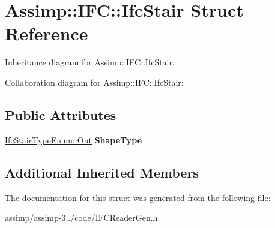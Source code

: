 \hypertarget{struct_assimp_1_1_i_f_c_1_1_ifc_stair}{\section{Assimp\+:\+:I\+F\+C\+:\+:Ifc\+Stair Struct Reference}
\label{struct_assimp_1_1_i_f_c_1_1_ifc_stair}
}


Inheritance diagram for Assimp\+:\+:I\+F\+C\+:\+:Ifc\+Stair\+:


Collaboration diagram for Assimp\+:\+:I\+F\+C\+:\+:Ifc\+Stair\+:
\subsection*{Public Attributes}
\begin{DoxyCompactItemize}
\item 
\hypertarget{struct_assimp_1_1_i_f_c_1_1_ifc_stair_aac9ba4f1859af748a93d65bead3083a7}{\hyperlink{classboost_1_1shared__ptr}{Ifc\+Stair\+Type\+Enum\+::\+Out} {\bfseries Shape\+Type}}\label{struct_assimp_1_1_i_f_c_1_1_ifc_stair_aac9ba4f1859af748a93d65bead3083a7}

\end{DoxyCompactItemize}
\subsection*{Additional Inherited Members}


The documentation for this struct was generated from the following file\+:\begin{DoxyCompactItemize}
\item 
assimp/assimp-\/3../code/I\+F\+C\+Reader\+Gen.\+h\end{DoxyCompactItemize}
